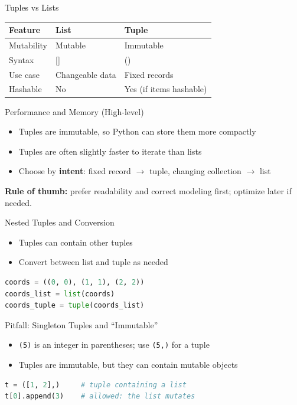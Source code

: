 \documentclass{beamer}
\begin{document}
\begin{frame}[fragile]{Tuples vs Lists}
  \small
  \begin{tabular}{lll}
    \toprule
    Feature & List & Tuple \\
    \midrule
    Mutability & Mutable & Immutable \\
    Syntax & [] & () \\
    Use case & Changeable data & Fixed records \\
    Hashable & No & Yes (if items hashable) \\
    \bottomrule
  \end{tabular}
  \normalsize
\end{frame}

\begin{frame}[fragile]{Performance and Memory (High-level)}
  \begin{itemize}[<+->]
    \item Tuples are immutable, so Python can store them more compactly
    \item Tuples are often slightly faster to iterate than lists
    \item Choose by \textbf{intent}: fixed record $\rightarrow$ tuple, changing collection $\rightarrow$ list
  \end{itemize}
  \vspace{0.4em}
  \textbf{Rule of thumb:} prefer readability and correct modeling first; optimize later if needed.
\end{frame}

\begin{frame}[fragile]{Nested Tuples and Conversion}
  \begin{itemize}[<+->]
    \item Tuples can contain other tuples
    \item Convert between list and tuple as needed
  \end{itemize}
  \vspace{0.4em}
  \begin{lstlisting}[language=Python]
coords = ((0, 0), (1, 1), (2, 2))
coords_list = list(coords)
coords_tuple = tuple(coords_list)
  \end{lstlisting}
\end{frame}

\begin{frame}[fragile]{Pitfall: Singleton Tuples and ``Immutable''}
  \begin{itemize}[<+->]
    \item \texttt{(5)} is an integer in parentheses; use \texttt{(5,)} for a tuple
    \item Tuples are immutable, but they can contain mutable objects
  \end{itemize}
  \vspace{0.4em}
  \begin{lstlisting}[language=Python]
t = ([1, 2],)     # tuple containing a list
t[0].append(3)    # allowed: the list mutates
  \end{lstlisting}
\end{frame}
\end{document}
